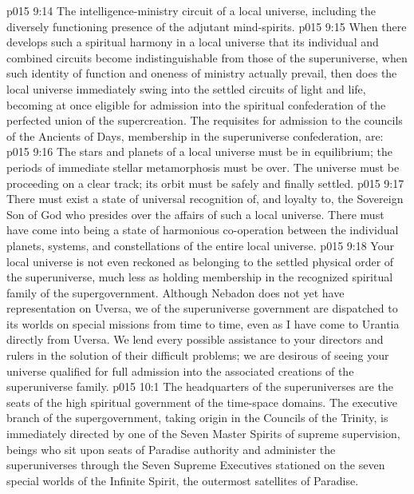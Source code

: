 \vs p015 9:14 \bibnobreakspace The intelligence\hyp{}ministry circuit of a local universe, including the diversely functioning presence of the adjutant mind\hyp{}spirits.
\vs p015 9:15 \pc When there develops such a spiritual harmony in a local universe that its individual and combined circuits become indistinguishable from those of the superuniverse, when such identity of function and oneness of ministry actually prevail, then does the local universe immediately swing into the settled circuits of light and life, becoming at once eligible for admission into the spiritual confederation of the perfected union of the supercreation. The requisites for admission to the councils of the Ancients of Days, membership in the superuniverse confederation, are:
\vs p015 9:16 \bibnobreakspace {} The stars and planets of a local universe must be in equilibrium; the periods of immediate stellar metamorphosis must be over. The universe must be proceeding on a clear track; its orbit must be safely and finally settled.
\vs p015 9:17 \bibnobreakspace {} There must exist a state of universal recognition of, and loyalty to, the Sovereign Son of God who presides over the affairs of such a local universe. There must have come into being a state of harmonious co\hyp{}operation between the individual planets, systems, and constellations of the entire local universe.
\vs p015 9:18 \pc Your local universe is not even reckoned as belonging to the settled physical order of the superuniverse, much less as holding membership in the recognized spiritual family of the supergovernment. Although Nebadon does not yet have representation on Uversa, we of the superuniverse government are dispatched to its worlds on special missions from time to time, even as I have come to Urantia directly from Uversa. We lend every possible assistance to your directors and rulers in the solution of their difficult problems; we are desirous of seeing your universe qualified for full admission into the associated creations of the superuniverse family.
\vs p015 10:1 The headquarters of the superuniverses are the seats of the high spiritual government of the time\hyp{}space domains. The executive branch of the supergovernment, taking origin in the Councils of the Trinity, is immediately directed by one of the Seven Master Spirits of supreme supervision, beings who sit upon seats of Paradise authority and administer the superuniverses through the Seven Supreme Executives stationed on the seven special worlds of the Infinite Spirit, the outermost satellites of Paradise.
